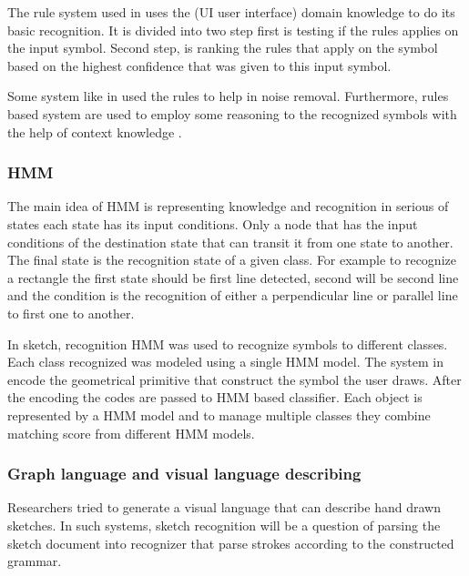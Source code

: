 The rule system used in \cite{sketchinginterfaces2}  uses the (UI user interface) domain knowledge to do its basic recognition. It is divided into two step first is testing if the rules applies on the input symbol. Second step, is ranking the rules that apply on the symbol based on the highest confidence that was given to this input symbol.

Some system like in \cite{SmartSketch56}  used the rules to help in noise removal. Furthermore, rules based system are used to employ some reasoning to the recognized symbols with the help of context knowledge \cite {interpretationmechanical50}.

\subsubsection{HMM }
\label{sec:HMM }

 The main idea of HMM is representing knowledge and recognition in serious of states each state has its input conditions. Only a node that has the input conditions of the destination state that can transit it from one state to another. The final state is the recognition state of a given class. For example to recognize a rectangle the first state should be first line detected, second will be second line and the condition is the recognition of either a perpendicular line or parallel line to first one to another. 


In sketch, recognition HMM was used to recognize symbols to different classes. Each class recognized was modeled using a single HMM model. The system in \cite {HMM53} encode the geometrical primitive that construct the symbol the user draws. After the encoding the codes are passed to HMM based classifier. Each object is represented by a HMM model and to manage multiple classes they combine matching score from different HMM models. 



\subsubsection{Graph language and visual language describing }
\label{sec:Graph language and visual language describing }


Researchers tried to generate a visual language that can describe hand drawn sketches. In such systems, sketch recognition will be a question of parsing the sketch document into recognizer that parse strokes according to the constructed grammar. 


